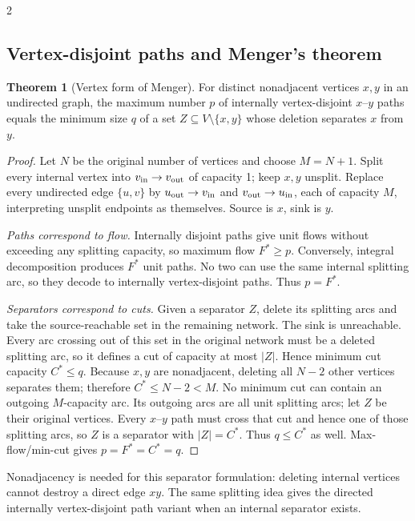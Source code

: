\documentclass[10pt]{article}
\theoremstyle{definition}
\newtheorem{theorem}[definition]{Theorem}
\begin{document}
\begin{multicols*}{2}
\subsection{Vertex-disjoint paths and Menger's theorem}\label{nf:menger}
\begin{theorem}[Vertex form of Menger]
For distinct nonadjacent vertices $x,y$ in an undirected graph, the maximum
number $p$ of internally vertex-disjoint $x$--$y$ paths equals the minimum
size $q$ of a set $Z\subseteq V\setminus\{x,y\}$ whose deletion separates
$x$ from $y$.
\end{theorem}
\begin{proof}
Let $N$ be the original number of vertices and choose $M=N+1$.
Split every internal vertex into $v_{\rm in}\to v_{\rm out}$ of capacity 1;
keep $x,y$ unsplit. Replace every undirected edge $\{u,v\}$ by
$u_{\rm out}\to v_{\rm in}$ and $v_{\rm out}\to u_{\rm in}$, each of capacity
$M$, interpreting unsplit endpoints as themselves. Source is $x$, sink is $y$.

\emph{Paths correspond to flow.} Internally disjoint paths give unit flows
without exceeding any splitting capacity, so maximum flow $F^*\ge p$.
Conversely, integral decomposition produces $F^*$ unit paths. No two can use
the same internal splitting arc, so they decode to internally vertex-disjoint
paths. Thus $p=F^*$.

\emph{Separators correspond to cuts.} Given a separator $Z$, delete its
splitting arcs and take the source-reachable set in the remaining network.
The sink is unreachable. Every arc crossing out of this set in the original
network must be a deleted splitting arc, so it defines a cut of capacity at
most $|Z|$. Hence minimum cut capacity $C^*\le q$.
Because $x,y$ are nonadjacent, deleting all $N-2$ other vertices separates
them; therefore $C^*\le N-2<M$. No minimum cut can contain an outgoing
$M$-capacity arc. Its outgoing arcs are all unit splitting arcs; let $Z$
be their original vertices. Every $x$--$y$ path must cross that cut and hence
one of those splitting arcs, so $Z$ is a separator with $|Z|=C^*$.
Thus $q\le C^*$ as well. Max-flow/min-cut gives $p=F^*=C^*=q$.
\end{proof}
Nonadjacency is needed for this separator formulation: deleting internal
vertices cannot destroy a direct edge $xy$. The same splitting idea gives
the directed internally vertex-disjoint path variant when an internal
separator exists.


\end{multicols*}
\end{document}

